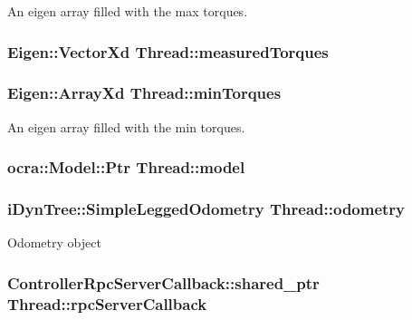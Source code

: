 \-An eigen array filled with the max torques. \hypertarget{classThread_aa9cbe8744e51571a17fa726d8d16a0c6}{
\subsubsection[{measured\-Torques}]{\setlength{\rightskip}{0pt plus 5cm}\-Eigen\-::\-Vector\-Xd {\bf \-Thread\-::measured\-Torques}}}\label{classThread_aa9cbe8744e51571a17fa726d8d16a0c6}
\hypertarget{classThread_a414015415c64371877d6028417c4f9e2}{
\subsubsection[{min\-Torques}]{\setlength{\rightskip}{0pt plus 5cm}\-Eigen\-::\-Array\-Xd {\bf \-Thread\-::min\-Torques}}}\label{classThread_a414015415c64371877d6028417c4f9e2}
\-An eigen array filled with the min torques. \hypertarget{classThread_a1dcef9aedc1a707e6f04d5fb6e4a0b13}{
\subsubsection[{model}]{\setlength{\rightskip}{0pt plus 5cm}ocra\-::\-Model\-::\-Ptr {\bf \-Thread\-::model}}}\label{classThread_a1dcef9aedc1a707e6f04d5fb6e4a0b13}
\hypertarget{classThread_a23a41c6ccd1df898084112cfd46120f3}{
\subsubsection[{odometry}]{\setlength{\rightskip}{0pt plus 5cm}i\-Dyn\-Tree\-::\-Simple\-Legged\-Odometry {\bf \-Thread\-::odometry}}}\label{classThread_a23a41c6ccd1df898084112cfd46120f3}
\-Odometry object \hypertarget{classThread_a602de8d12886c9c57b5420c83804a38b}{
\subsubsection[{rpc\-Server\-Callback}]{\setlength{\rightskip}{0pt plus 5cm}\-Controller\-Rpc\-Server\-Callback\-::shared\-\_\-ptr {\bf \-Thread\-::rpc\-Server\-Callback}}}\label{classThread_a602de8d12886c9c57b5420c83804a38b}
